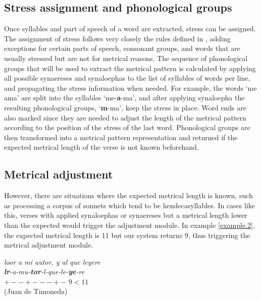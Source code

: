 \documentclass[a4paper,11pt,twocolumn,twoside]{article}
\begin{document}
\subsection{Stress assignment and phonological groups}
Once syllables and part of speech of a word are extracted, stress can be assigned. The assignment of stress follows very closely the rules defined in \cite{espanola2010ortografia}, adding exceptions for certain parts of speech, consonant groups, and words that are usually stressed but are not for metrical reasons. The sequence of phonological groups that will be used to extract the metrical pattern is calculated by applying all possible synaereses and synaloephas to the list of syllables of words per line, and propagating the stress information when needed. For example, the words `me ama' are split into the syllables `me-\textbf{a}-ma', and after applying synaloepha the resulting phonological groups, `\textbf{m}-ma', keep the stress in place. Word ends are also marked since they are needed to adjust the length of the metrical pattern according to the position of the stress of the last word. Phonological groups are then transformed into a metrical pattern representation and returned if the expected metrical length of the verse is not known beforehand.

\subsection{Metrical adjustment}
However, there are situations where the expected metrical length is known, such as processing a corpus of sonnets which tend to be hendecasyllables. In cases like this, verses with applied synaloephas or synaereses but a metrical length lower than the expected would trigger the adjustment module.
In example \ref{example.2}, the expected metrical length is 11 but our system returns 9, thus triggering the metrical adjustment module.

\begin{subexamples}\label{example.2}
\textit{loor a mi autor, y al que leyere} \\
\textit{\textbf{lr}-a-mu-\textbf{tor}-l-que-le-\textbf{ye}-re} \\
$+--+---+-$ $9 < 11$ \\
(Juan de Timoneda)
\end{subexamples}
\end{document}
